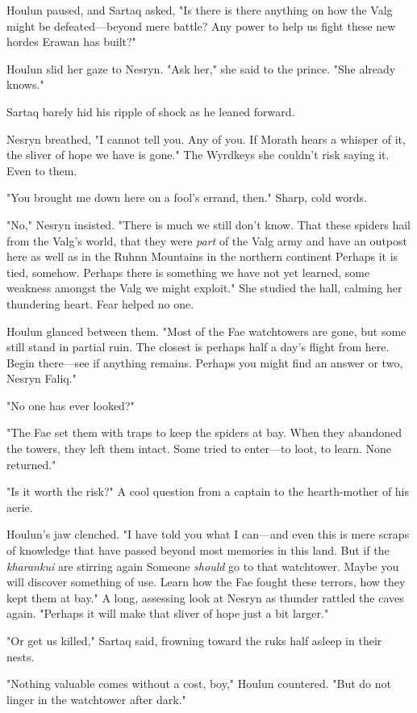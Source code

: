 Houlun paused, and Sartaq asked, "Is there  is there anything on how the Valg might be defeated---beyond mere battle? Any power to help us fight these new hordes Erawan has built?"

Houlun slid her gaze to Nesryn. "Ask her," she said to the prince. "She already knows."

Sartaq barely hid his ripple of shock as he leaned forward.

Nesryn breathed, "I cannot tell you. Any of you. If Morath hears a whisper of it, the sliver of hope we have is gone." The Wyrdkeys
 she couldn't risk saying it. Even to them.

"You brought me down here on a fool's errand, then." Sharp, cold words.

"No," Nesryn insisted. "There is much we still don't know. That these spiders hail from the Valg's world, that they were \emph{part} of the Valg army and have an outpost here as well as in the Ruhnn Mountains in the northern continent  Perhaps it is tied, somehow. Perhaps there is something we have not yet learned, some weakness amongst the Valg we might exploit." She studied the hall, calming her thundering heart. Fear helped no one.

Houlun glanced between them. "Most of the Fae watchtowers are gone, but some still stand in partial ruin. The closest is perhaps half a day's flight from here. Begin there---see if anything remains. Perhaps you might find an answer or two, Nesryn Faliq."

"No one has ever looked?"

"The Fae set them with traps to keep the spiders at bay. When they abandoned the towers, they left them intact. Some tried to enter---to loot, to learn. None returned."

"Is it worth the risk?" A cool question from a captain to the hearth-mother of his aerie.

Houlun's jaw clenched. "I have told you what I can---and even this is mere scraps of knowledge that have passed beyond most memories in this land. But if the \emph{kharankui} are stirring again  Someone
\emph{should} go to that watchtower. Maybe you will discover something of use. Learn how the Fae fought these terrors, how they kept them at bay." A long, assessing look at Nesryn as thunder rattled the caves again. "Perhaps it will make that sliver of hope just a bit larger."

"Or get us killed," Sartaq said, frowning toward the ruks half asleep in their nests.

"Nothing valuable comes without a cost, boy," Houlun countered. "But do not linger in the watchtower after dark."

